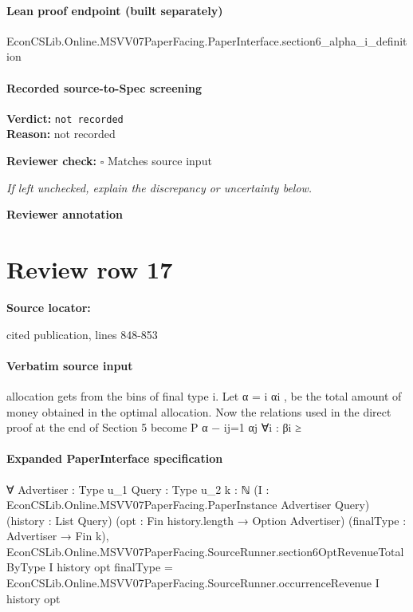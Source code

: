 \documentclass[10pt]{article}
\newcommand{\reviewerbox}{%
  \par\noindent\fbox{\parbox{0.96\linewidth}{\rule{0pt}{0.38in}}}\par
}
\newcommand{\reviewmatch}[1]{%
  \par\noindent\textbf{Reviewer check:} $\square$\; #1\par
  \noindent\emph{If left unchecked, explain the discrepancy or uncertainty below.}\par
}
\begin{document}
\paragraph{Lean proof endpoint (built separately)}\begin{ReviewVerbatim}
EconCSLib.Online.MSVV07PaperFacing.PaperInterface.section6_alpha_i_definition
\end{ReviewVerbatim}

\paragraph{Recorded source-to-Spec screening}
\textbf{Verdict:} \texttt{not recorded}
\\
\textbf{Reason:} not recorded
\reviewmatch{Matches source input}
\noindent\textbf{Reviewer annotation}\par
\reviewerbox
\clearpage
\hypertarget{source-claim-2f7b2f5085f64f71}{}
\section*{Review row 17}
\textbf{Source locator:} {\footnotesize\raggedright cited publication, lines 848-\allowbreak{}853\par}
\paragraph{Verbatim source input}
\begin{ReviewVerbatim}
allocation gets from the bins of final type i. Let α = i αi , be the total amount of money
obtained in the optimal allocation.
Now the relations used in the direct proof at the end of Section 5 become
P
α − ij=1 αj
∀i : βi ≥
\end{ReviewVerbatim}


\paragraph{Expanded PaperInterface specification}
\begin{ReviewVerbatim}
∀ {Advertiser : Type u_1} {Query : Type u_2} {k : ℕ}
  (I : EconCSLib.Online.MSVV07PaperFacing.PaperInstance Advertiser Query) (history : List Query)
  (opt : Fin history.length → Option Advertiser) (finalType : Advertiser → Fin k),
  EconCSLib.Online.MSVV07PaperFacing.SourceRunner.section6OptRevenueTotalByType I history opt finalType =
    EconCSLib.Online.MSVV07PaperFacing.SourceRunner.occurrenceRevenue I history opt
\end{ReviewVerbatim}
\end{document}
